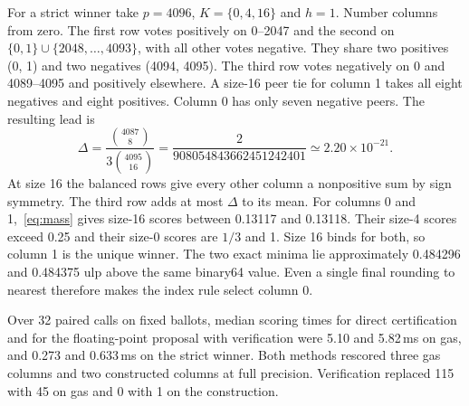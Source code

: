 For a strict winner take $p=4096$, $K=\{0,4,16\}$ and $h=1$. Number columns from zero. The first row votes positively on 0--2047 and the second on $\{0,1\}\cup\{2048,\ldots,4093\}$, with all other votes negative. They share two positives (0, 1) and two negatives (4094, 4095). The third row votes negatively on 0 and 4089--4095 and positively elsewhere. A size-16 peer tie for column 1 takes all eight negatives and eight positives. Column 0 has only seven negative peers. The resulting lead is
\[
 \Delta=\frac{\binom{4087}{8}}{3\binom{4095}{16}}
       =\frac{2}{908054843662451242401}\simeq 2.20\times10^{-21}.
\]
At size 16 the balanced rows give every other column a nonpositive sum by sign symmetry. The third row adds at most $\Delta$ to its mean. For columns 0 and 1,~\eqref{eq:mass} gives size-16 scores between 0.13117 and 0.13118. Their size-4 scores exceed 0.25 and their size-0 scores are $1/3$ and 1. Size 16 binds for both, so column 1 is the unique winner. The two exact minima lie approximately 0.484296 and 0.484375 ulp above the same binary64 value. Even a single final rounding to nearest therefore makes the index rule select column 0.

Over 32 paired calls on fixed ballots, median scoring times for direct certification and for the floating-point proposal with verification were 5.10 and 5.82\,ms on gas, and 0.273 and 0.633\,ms on the strict winner. Both methods rescored three gas columns and two constructed columns at full precision. Verification replaced 115 with 45 on gas and 0 with 1 on the construction.

